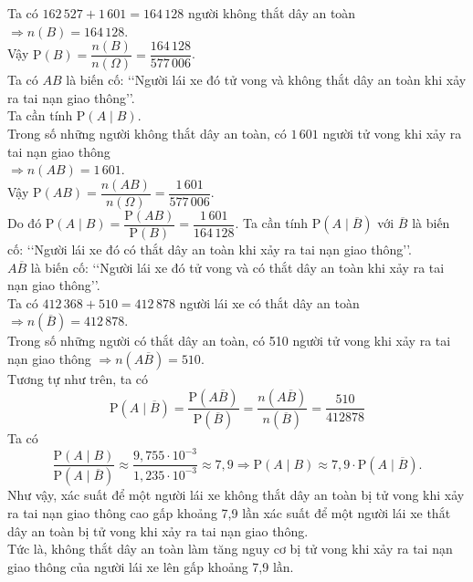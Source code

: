 \begin{ex}
{\begin{itemchoice}
			Ta có $162\,527+1\,601=164\,128$ người không thắt dây an toàn $\Rightarrow n(B)=164\,128$.\\
			Vậy $\mathrm{P}(B)=\dfrac{n(B)}{n(\Omega)}=\dfrac{164\,128}{577\,006}$.\\
			\itemch Ta có $AB$ là biến cố: \lq\lq Người lái xe đó tử vong và không thắt dây an toàn khi xảy ra tai nạn giao thông\rq\rq.\\
			Ta cần tính $\mathrm{P}(A\mid B)$.\\
			Trong số những người không thắt dây an toàn, có $1\,601$ người tử vong khi xảy ra tai nạn giao thông\\ 
			$\Rightarrow n(AB)=1\,601$. \\
			Vậy $\mathrm{P}(AB)=\dfrac{n(AB)}{n(\Omega)}=\dfrac{1\,601}{577\,006}$.\\
			Do đó $\mathrm{P}(A\mid B)=\dfrac{\mathrm{P}(AB)}{\mathrm{P}(B)}=\dfrac{1\,601}{164\,128}$.
			\itemch Ta cần tính $\mathrm{P}\left(A\mid\overline{B}\right)$ với 
			$\overline{B}$ là biến cố: \lq\lq Người lái xe đó có thắt dây an toàn khi xảy ra tai nạn giao thông\rq\rq.\\
			$A\overline{B}$ là biến cố: \lq\lq Người lái xe đó tử vong và có thắt dây an toàn khi xảy ra tai nạn giao thông\rq\rq.\\
			Ta có $412\,368+510=412\,878$ người lái xe có thắt dây an toàn $\Rightarrow n(\overline{B})=412\,878$.\\
			Trong số những người có thắt dây an toàn, có 510 người tử vong khi xảy ra tai nạn giao thông $\Rightarrow n(A\overline{B})=510$.\\
			Tương tự như trên, ta có
			$$\mathrm{P}\left(A \mid\overline{B}\right)=\dfrac{\mathrm{P}\left(A \overline{B}\right)}{\mathrm{P}\left(\overline{B}\right)}=\dfrac{n\left(A \overline{B}\right)}{n\left(\overline{B}\right)}=\dfrac{510}{412878}$$
			\itemch Ta có
			$$\dfrac{\mathrm{P}(A \mid B)}{\mathrm{P}\left(A \mid\overline{B}\right)} \approx\dfrac{9{,}755 \cdot 10^{-3}}{1{,}235 \cdot 10^{-3}} \approx 7{,}9 \Rightarrow \mathrm{P}(A \mid B) \approx 7{,}9 \cdot \mathrm{P}\left(A \mid\overline{B}\right).$$
			Như vậy, xác suất để một người lái xe không thắt dây an toàn bị tử vong khi xảy ra tai nạn giao thông cao gấp khoảng 7{,}9 lần xác suất để một người lái xe thắt dây an toàn bị tử vong khi xảy ra tai nạn giao thông. \\
			Tức là, không thắt dây an toàn làm tăng nguy cơ bị tử vong khi xảy ra tai nạn giao thông của người lái xe lên gấp khoảng 7{,}9 lần.
		\end{itemchoice}
	}
\end{ex}

